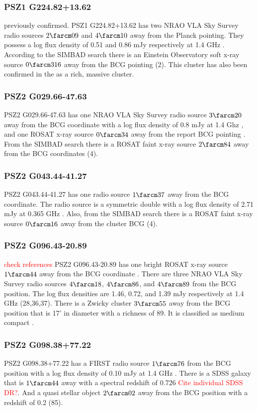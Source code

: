 \documentclass[apj, revtex4-1]{emulateapj}
\newcommand{\editorial}[1]{\textcolor{red}{#1}}
\begin{document}
\subsubsection{PSZ1 G224.82+13.62}
previously confirmed. PSZ1 G224.82+13.62 has two NRAO VLA Sky Survey radio sources $2\farcm09$ and $4\farcm10$ away from the Planck pointing. They possess a log flux density of 0.51 and 0.86 mJy respectively at 1.4 GHz \citep{Condon1998}. According to the SIMBAD search there is an Einstein Observatory soft x-ray source $0\farcm316$ away from the BCG pointing (2). This cluster has also been confirmed in the \citep{Barrena2018} as a rich, massive cluster.

\subsubsection{PSZ2 G029.66-47.63}
PSZ2 G029.66-47.63 has one NRAO VLA Sky Survey radio source $3\farcm20$ away from the BCG coordinate with a log flux density of 0.8 mJy at 1.4 Ghz \citep{Condon1998}, and one ROSAT x-ray source $0\farcm34$ away from the report BCG pointing \citep{Voges2000}. From the SIMBAD search there is a ROSAT faint x-ray source $2\farcm84$ away from the BCG coordinates (4).


\subsubsection{PSZ2 G043.44-41.27}
PSZ2 G043.44-41.27 has one radio source $1\farcm37$ away from the BCG coordinate. The radio source is a symmetric double with a log flux density of 2.71 mJy at 0.365 GHz \citep{Condon1998}. Also, from the SIMBAD search there is a ROSAT faint x-ray source $0\farcm16$ away from the cluster BCG (4).

\subsubsection{PSZ2 G096.43-20.89}
\editorial{check references}
PSZ2 G096.43-20.89 has one bright ROSAT x-ray source $1\farcm44$ away from the BCG coordinate \citep{Voges1999a}. There are three NRAO VLA Sky Survey radio sources $4\farcm18$, $4\farcm86$, and $4\farcm89$ from the BCG position. The log flux densities are 1.46, 0.72, and 1.39 mJy respectively at 1.4 GHz (28,36,37). There is a Zwicky cluster $3\farcm55$ away from the BCG position that is 17' in diameter with a richness of 89. It is classified as medium compact \citep{Zwicky1968}.

\subsubsection{PSZ2 G098.38+77.22}
PSZ2 G098.38+77.22 has a FIRST radio source $1\farcm76$ from the BCG position with a log flux density of 0.10 mJy at 1.4 GHz \citep{Becker1995}. There is a SDSS galaxy that is $1\farcm44$ away with a spectral redshift of 0.726 \editorial{Cite individual SDSS DR?}. And a quasi stellar object $2\farcm02$ away from the BCG position with a redshift of 0.2 (85). 
\end{document}
